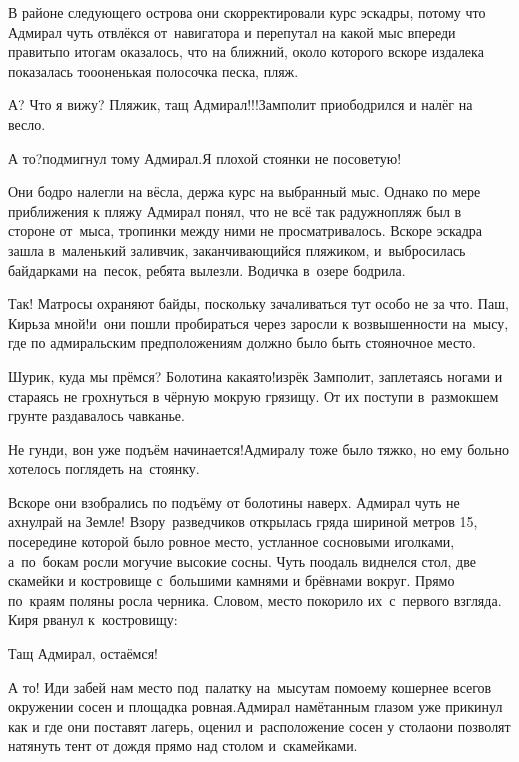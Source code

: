 В районе следующего острова они скорректировали курс эскадры, потому что Адмирал чуть отвлёкся от~навигатора и перепутал на какой мыс впереди править\mdash по итогам оказалось, что на ближний, около которого вскоре издалека показалась то\sdash о\sdash оненькая полосочка песка, пляж.

\diagdash А? Что я вижу? Пляжик, тащ Адмирал!!!\mdash Замполит приободрился и налёг на весло.

\diagdash А то?\mdash подмигнул тому Адмирал.\mdash Я плохой стоянки не посоветую!

Они бодро налегли на вёсла, держа курс на выбранный мыс. Однако по мере приближения к пляжу Адмирал понял, что не всё так радужно\mdash пляж был в стороне от~мыса, тропинки между ними не просматривалось. Вскоре эскадра зашла в~маленький заливчик, заканчивающийся пляжиком, и~выбросилась байдарками на~песок, ребята вылезли. Водичка в~озере бодрила.

\diagdash Так! Матросы охраняют байды, поскольку зачаливаться тут особо не за что. Паш, Кирь\mdash за мной!\mdash и~они пошли пробираться через заросли к возвышенности на~мысу, где по адмиральским предположениям должно было быть стояночное место.

\diagdash Шурик, куда мы прёмся? Болотина какая\sdash то!\mdash изрёк Замполит, заплетаясь ногами и стараясь не грохнуться в чёрную мокрую грязищу. От их поступи в~размокшем грунте раздавалось чавканье.

\diagdash Не гунди, вон уже подъём начинается!\mdash Адмиралу тоже было тяжко, но ему больно хотелось поглядеть на~стоянку. 

Вскоре они взобрались по подъёму от болотины наверх. Адмирал чуть не ахнул\mdash рай на Земле! Взору~разведчиков открылась гряда шириной метров 15, посередине которой было ровное место, устланное сосновыми иголками, а~по~бокам росли могучие высокие сосны. Чуть поодаль виднелся стол, две скамейки и костровище с~большими камнями и брёвнами вокруг. Прямо по~краям поляны росла черника. Словом, место покорило их~с~первого взгляда. Киря рванул к~костровищу:

\diagdash Тащ Адмирал, остаёмся!

\diagdash А то! Иди забей нам место под~палатку на~мысу\mdash там по\sdash моему кошернее всего\mdash в окружении сосен и площадка ровная.\mdash Адмирал намётанным глазом уже прикинул как и где они поставят лагерь, оценил и~расположение сосен у стола\mdash они позволят натянуть тент от дождя прямо над столом и~скамейками. 


